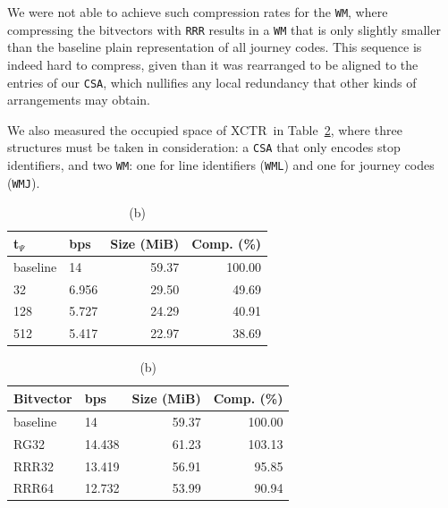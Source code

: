 \documentclass[runningheads]{llncs}
\newcommand{\ctr}{XCTR}
\begin{document}
We were not able to achieve such compression rates for the \texttt{WM}, where compressing the bitvectors with \texttt{RRR} results in a \texttt{WM} that is only slightly smaller than the baseline plain representation of all journey codes. This sequence is indeed hard to compress, given than it was rearranged to be aligned to the entries of our \texttt{CSA}, which nullifies any local redundancy that other kinds of arrangements may obtain.

We also measured the occupied space of \ctr~in Table~\ref{tab:ctr}, where three structures must be taken in consideration: a \texttt{CSA} that only encodes stop identifiers, and two \texttt{WM}: one for line identifiers (\texttt{WML}) and one for journey codes (\texttt{WMJ}).

\begin{table}
    \caption{Space requirements for the \texttt{CSA} (a), the \texttt{WMJ} (b) and the \texttt{WML} (c) from \ctr}
    \label{tab:ctr}
    \begin{subtable}[t]{.48\linewidth}
    \vspace{-12pt}
    \caption{\footnotesize (a)}
    \vspace{-12pt}
    \begin{tabular}[t]{|l|l|r|r|}
        \hline
        t$_\Psi$ & bps & Size (MiB) & Comp. (\%) \\
         \hline
        baseline & 14 & 59.37 & 100.00 \\
        32 & 6.956 & 29.50 & 49.69 \\
        128 & 5.727 & 24.29 & 40.91 \\
        512 & 5.417 & 22.97 & 38.69 \\
        \hline
    \end{tabular}
    \end{subtable}
    \begin{subtable}[t]{.48\linewidth}
    \vspace{-12pt}
    \caption{\footnotesize (b)}
    \vspace{-12pt}
    \begin{tabular}[t]{|l|l|r|r|}
        \hline
        Bitvector & bps & Size (MiB) & Comp. (\%) \\
         \hline
        baseline & 14 & 59.37 & 100.00 \\
        RG32 & 14.438 & 61.23 & 103.13 \\
        RRR32 & 13.419 & 56.91 & 95.85 \\
        RRR64 & 12.732 & 53.99 & 90.94 \\

\end{tabular}
\end{subtable}
\end{table}
\end{document}
